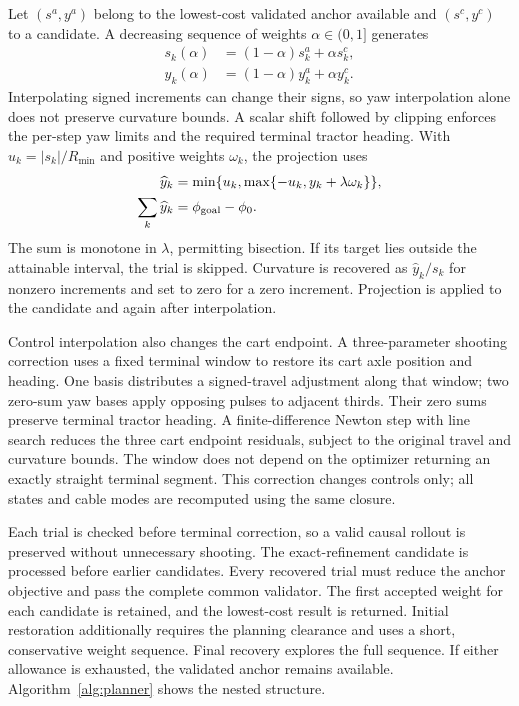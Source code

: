 Let $(s^a,y^a)$ belong to the lowest-cost validated anchor available and $(s^c,y^c)$ to a candidate. A decreasing sequence of weights $\alpha\in(0,1]$ generates
\begin{equation}\begin{aligned}
 s_k(\alpha)&=(1-\alpha)s_k^a+\alpha s_k^c,\\
 y_k(\alpha)&=(1-\alpha)y_k^a+\alpha y_k^c.
\end{aligned}\label{eq:blend}\end{equation}
Interpolating signed increments can change their signs, so yaw interpolation alone does not preserve curvature bounds. A scalar shift followed by clipping enforces the per-step yaw limits and the required terminal tractor heading. With $u_k=|s_k|/R_{\min}$ and positive weights $\omega_k$, the projection uses
\begin{equation}\begin{aligned}
 \widehat y_k&=\min\{u_k,\max\{-u_k,y_k+\lambda\omega_k\}\},\\
 \sum_k\widehat y_k&=\phi_{\rm goal}-\phi_0.
\end{aligned}\label{eq:yawprojection}\end{equation}
The sum is monotone in $\lambda$, permitting bisection. If its target lies outside the attainable interval, the trial is skipped. Curvature is recovered as $\widehat y_k/s_k$ for nonzero increments and set to zero for a zero increment. Projection is applied to the candidate and again after interpolation.

Control interpolation also changes the cart endpoint. A three-parameter shooting correction uses a fixed terminal window to restore its cart axle position and heading. One basis distributes a signed-travel adjustment along that window; two zero-sum yaw bases apply opposing pulses to adjacent thirds. Their zero sums preserve terminal tractor heading. A finite-difference Newton step with line search reduces the three cart endpoint residuals, subject to the original travel and curvature bounds. The window does not depend on the optimizer returning an exactly straight terminal segment. This correction changes controls only; all states and cable modes are recomputed using the same closure.

Each trial is checked before terminal correction, so a valid causal rollout is preserved without unnecessary shooting. The exact-refinement candidate is processed before earlier candidates. Every recovered trial must reduce the anchor objective and pass the complete common validator. The first accepted weight for each candidate is retained, and the lowest-cost result is returned. Initial restoration additionally requires the planning clearance and uses a short, conservative weight sequence. Final recovery explores the full sequence. If either allowance is exhausted, the validated anchor remains available. Algorithm~\ref{alg:planner} shows the nested structure.

